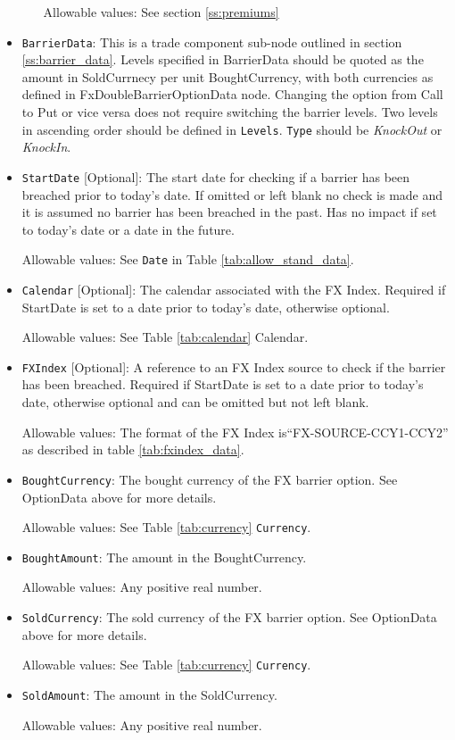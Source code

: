 \begin{itemize}
\begin{itemize}
Allowable values:  See section \ref{ss:premiums}

\end{itemize}


\item \lstinline!BarrierData!: This is a trade component sub-node outlined in section \ref{ss:barrier_data}.
Levels specified in BarrierData should be quoted as the amount in SoldCurrnecy per unit BoughtCurrency, with both currencies as defined in FxDoubleBarrierOptionData node.
Changing the option from Call to Put or vice versa does not require switching the barrier levels. Two levels in ascending order should be defined in \lstinline!Levels!. \lstinline!Type! should be \emph{KnockOut} or \emph{KnockIn}.

\item \lstinline!StartDate! [Optional]: The start date for checking if a barrier has been breached prior to today's date.  If omitted or left blank no check is made and it is assumed no barrier has been breached in the past. Has no impact if set to today's date or a date in the future.

Allowable values:  See \lstinline!Date! in Table \ref{tab:allow_stand_data}.

\item \lstinline!Calendar! [Optional]: The calendar associated with the FX Index. Required if StartDate is set to a date prior to today's date, otherwise optional.

Allowable values: See Table \ref{tab:calendar} Calendar.

\item \lstinline!FXIndex! [Optional]: A reference to an FX Index source to check if the barrier has been breached. Required if StartDate is set to a date prior to today's date, otherwise optional and can be omitted but not left blank.

Allowable values:  The format of the FX Index is``FX-SOURCE-CCY1-CCY2'' as described in table \ref{tab:fxindex_data}. 

\item \lstinline!BoughtCurrency!: The bought currency of the FX barrier option. See OptionData above for more details.

Allowable values:  See Table \ref{tab:currency} \lstinline!Currency!.

\item \lstinline!BoughtAmount!: The amount in the BoughtCurrency.  

Allowable values:  Any positive real number.

\item \lstinline!SoldCurrency!: The sold currency of the FX barrier option. See OptionData above for more details.

Allowable values:  See Table \ref{tab:currency} \lstinline!Currency!.

\item \lstinline!SoldAmount!: The amount in the SoldCurrency.  

Allowable values:  Any positive real number.

\end{itemize}
